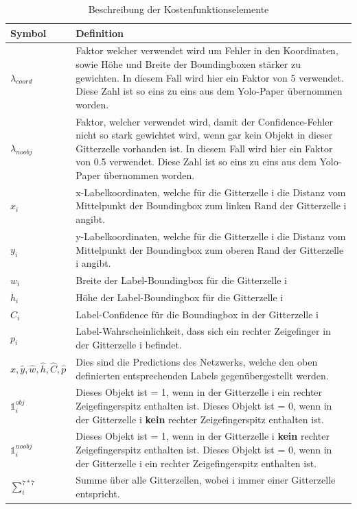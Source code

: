 \begin{table}
\centering
\begin{tabularx}{\textwidth}{|l|X|}
\hline  \textbf{Symbol} & \textbf{Definition}\\
\hline  $\lambda_{coord}$  & Faktor welcher verwendet wird um Fehler in den Koordinaten, sowie Höhe und Breite der Boundingboxen stärker zu gewichten. In diesem Fall wird hier ein Faktor von 5 verwendet. Diese Zahl ist so eins zu eins aus dem Yolo-Paper \cite{yolo} übernommen worden.\\
\hline  $\lambda_{noobj}$  & Faktor, welcher verwendet wird, damit der Confidence-Fehler nicht so stark gewichtet wird, wenn gar kein Objekt in dieser Gitterzelle vorhanden ist. In diesem Fall wird hier ein Faktor von 0.5 verwendet. Diese Zahl ist so eins zu eins aus dem Yolo-Paper \cite{yolo} übernommen worden.\\
\hline  $x_i$  & x-Labelkoordinaten, welche für die Gitterzelle i die Distanz vom Mittelpunkt der Boundingbox zum linken Rand der Gitterzelle i angibt.\\
\hline  $y_i$  & y-Labelkoordinaten, welche für die Gitterzelle i die Distanz vom Mittelpunkt der Boundingbox zum oberen Rand der Gitterzelle i angibt.\\
\hline  $w_i$  & Breite der Label-Boundingbox für die Gitterzelle i\\
\hline  $h_i$  & Höhe der Label-Boundingbox für die Gitterzelle i\\
\hline  $C_i$  & Label-Confidence für die Boundingbox in der Gitterzelle i\\
\hline  $p_i$  & Label-Wahrscheinlichkeit, dass sich ein rechter Zeigefinger in der Gitterzelle i befindet. \\	
\hline  $\hat{x},\hat{y},\hat{w},\hat{h},\hat{C},\hat{p}$  & Dies sind die Predictions des Netzwerks, welche den oben definierten entsprechenden Labels gegenübergestellt werden.\\
\hline  $\mathds{1}_{i}^{obj}$  & Dieses Objekt ist = 1, wenn in der Gitterzelle i ein rechter Zeigefingerspitz enthalten ist. Dieses Objekt ist = 0, wenn in der Gitterzelle i \textbf{kein} rechter Zeigefingerspitz enthalten ist.\\	
\hline  $\mathds{1}_{i}^{noobj}$  & Dieses Objekt ist = 1, wenn in der Gitterzelle i \textbf{kein} rechter Zeigefingerspitz enthalten ist. Dieses Objekt ist = 0, wenn in der Gitterzelle i ein rechter Zeigefingerspitz enthalten ist.\\
\hline $\sum_{i}^{7*7}$ & Summe über alle Gitterzellen, wobei i immer einer Gitterzelle entspricht.\\
\hline
\end{tabularx}
\caption{Beschreibung der Kostenfunktionselemente}
\label{tbl:beschr_kostenfuntion}
\end{table} 

